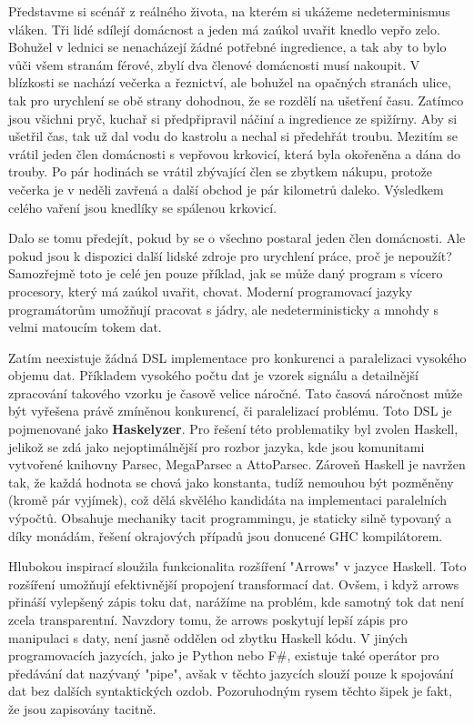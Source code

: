 \documentclass[male,czech]{kithesis}
\begin{document}
Představme si scénář z reálného života, 
na kterém si ukážeme nedeterminismus vláken.
Tři lidé sdílejí domácnost a 
jeden má zaúkol uvařit knedlo vepřo zelo.
Bohužel v lednici se nenacházejí žádné potřebné ingredience,
a tak aby to bylo vůči všem stranám férové,
zbylí dva členové domácnosti musí nakoupit.
V blízkosti se nachází večerka a řeznictví, 
ale bohužel na opačných stranách ulice, 
tak pro urychlení se obě strany dohodnou, 
že se rozdělí na ušetření času.
Zatímco jsou všichni pryč,
kuchař si předpřipravil náčiní a ingredience ze spižírny.
Aby si ušetřil čas, 
tak už dal vodu do kastrolu a nechal si předehřát troubu.
Mezitím se vrátil jeden člen domácnosti s vepřovou krkovicí,
která byla okořeněna a dána do trouby.
Po pár hodinách se vrátil zbývající člen se zbytkem nákupu, 
protože večerka je v neděli zavřená a 
další obchod je pár kilometrů daleko.
Výsledkem celého vaření jsou knedlíky se spálenou krkovicí.

Dalo se tomu předejít,
pokud by se o všechno postaral jeden člen domácnosti.
Ale pokud jsou k dispozici další lidské zdroje pro urychlení práce,
proč je nepoužít?
Samozřejmě toto je celé jen pouze příklad,
jak se může daný program s vícero procesory, 
který má zaúkol uvařit, chovat.
Moderní programovací jazyky programátorům umožňují pracovat s jádry,
ale nedeterministicky a mnohdy s velmi matoucím tokem dat. 

Zatím neexistuje žádná DSL implementace pro konkurenci a
paralelizaci vysokého objemu dat.
Příkladem vysokého počtu dat je vzorek signálu a 
detailnější zpracování takového vzorku je časově velice náročné. 
Tato časová náročnost může být vyřešena právě zmíněnou konkurencí, 
či paralelizací problému. 
Toto DSL je pojmenované jako \textbf{Haskelyzer}.
Pro řešení této problematiky byl zvolen Haskell, 
jelikož se zdá jako nejoptimálnější pro rozbor jazyka,
kde jsou komunitami vytvořené knihovny Parsec, MegaParsec a AttoParsec.
Zároveň Haskell je navržen tak, 
že každá hodnota se chová jako konstanta, 
tudíž nemouhou být pozměněny (kromě pár vyjímek),
což dělá skvělého kandidáta na implementaci paralelních výpočtů.
Obsahuje mechaniky tacit programmingu, 
je staticky silně typovaný a díky monádám, 
řešení okrajových případů jsou donucené GHC kompilátorem.

Hlubokou inspirací sloužila funkcionalita rozšíření "Arrows" 
v jazyce Haskell. %
Toto rozšíření umožňují efektivnější propojení transformací dat.
Ovšem,
i když arrows přináší vylepšený zápis toku dat,
narážíme na problém,
kde samotný tok dat není zcela transparentní.
Navzdory tomu,
že arrows poskytují lepší zápis pro manipulaci s daty,
není jasně oddělen od zbytku Haskell kódu.
V jiných programovacích jazycích,
jako je Python nebo F\#,
existuje také operátor pro předávání dat nazývaný "pipe",
avšak v těchto jazycích slouží pouze k spojování dat bez dalších syntaktických ozdob.
Pozoruhodným rysem těchto šipek je fakt,
že jsou zapisovány tacitně.
\end{document}
